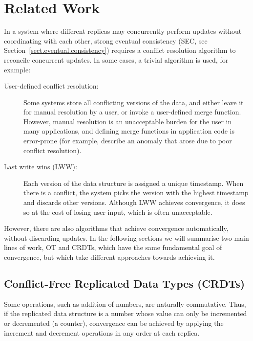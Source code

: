 \section{Related Work}\label{sect.relatedwork}

In a system where different replicas may concurrently perform updates without coordinating with each
other, strong eventual consistency (SEC, see Section~\ref{sect.eventual.consistency}) requires a
conflict resolution algorithm to reconcile concurrent updates. In some cases, a trivial algorithm is
used, for example:

\begin{description}
\item[User-defined conflict resolution:] Some systems store all conflicting versions of the data,
and either leave it for manual resolution by a user, or invoke a user-defined merge function.
However, manual resolution is an unacceptable burden for the user in many applications, and defining
merge functions in application code is error-prone (for example, \citet{DeCandia:2007ui} describe an
anomaly that arose due to poor conflict resolution).

\item[Last write wins (LWW):] Each version of the data structure is assigned a unique timestamp.
When there is a conflict, the system picks the version with the highest timestamp and discards other
versions. Although LWW achieves convergence, it does so at the cost of losing user input, which is
often unacceptable.
\end{description}

However, there are also algorithms that achieve convergence automatically, without discarding
updates. In the following sections we will summarise two main lines of work, OT and CRDTs, which
have the same fundamental goal of convergence, but which take different approaches towards achieving
it.

\subsection{Conflict-Free Replicated Data Types (CRDTs)}\label{sect.related.crdts}

Some operations, such as addition of numbers, are naturally commutative. Thus, if the replicated
data structure is a number whose value can only be incremented or decremented (a counter),
convergence can be achieved by applying the increment and decrement operations in any order at each
replica.

